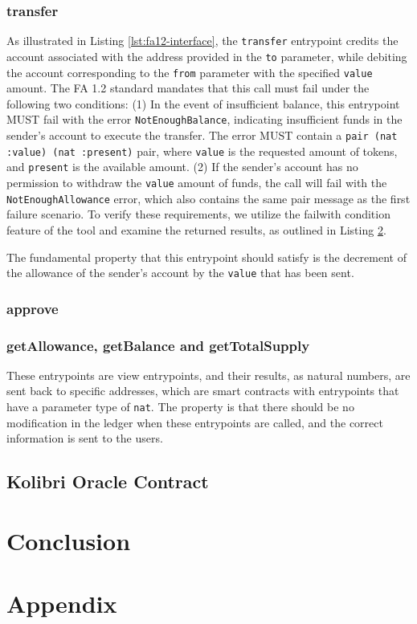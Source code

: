 \documentclass[a4paper,UKenglish,cleveref, autoref, thm-restate]{lipics-v2021}
\begin{document}
\subsubsection{transfer}
As illustrated in Listing \ref{lst:fa12-interface}, the \lstinline/transfer/ entrypoint credits the account associated with the address provided in the \lstinline/to/ parameter, while debiting the account corresponding to the \lstinline/from/ parameter with the specified \lstinline/value/ amount. The FA 1.2 standard mandates that this call must fail under the following two conditions: (1) In the event of insufficient balance, this entrypoint MUST fail with the error \lstinline/NotEnoughBalance/, indicating insufficient funds in the sender's account to execute the transfer. The error MUST contain a \lstinline/pair (nat :value) (nat :present)/ pair, where \lstinline/value/ is the requested amount of tokens, and \lstinline/present/ is the available amount. (2) If the sender's account has no permission to withdraw the \lstinline/value/ amount of funds, the call will fail with the \lstinline/NotEnoughAllowance/ error, which also contains the same pair message as the first failure scenario. To verify these requirements, we utilize the failwith condition feature of the tool and examine the returned results, as outlined in Listing \ref{}.  

The fundamental property that this entrypoint should satisfy is the decrement of the allowance of the sender's account by the \lstinline/value/ that has been sent.

\subsubsection{approve}

\subsubsection{getAllowance, getBalance and  getTotalSupply}
These entrypoints are view entrypoints, and their results, as natural numbers, are sent back to specific addresses, which are smart contracts with entrypoints that have a parameter type of \lstinline/nat/. The property is that there should be no modification in the ledger when these entrypoints are called, and the correct information is sent to the users.

\subsection{Kolibri Oracle Contract}
\section {Conclusion}
\section {Appendix}
\end{document}
